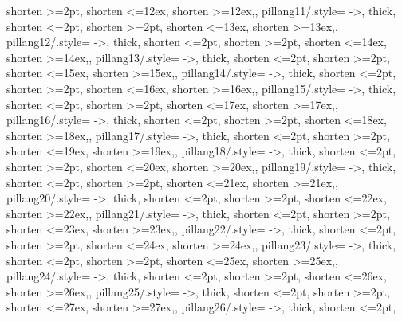 \documentclass[a4paper]{article}
\begin{document}
{{           shorten >=2pt,
           shorten <=12ex,
           shorten >=12ex,},
    pillang11/.style={
           ->,
           thick,
           shorten <=2pt,
           shorten >=2pt,
           shorten <=13ex,
           shorten >=13ex,},
    pillang12/.style={
           ->,
           thick,
           shorten <=2pt,
           shorten >=2pt,
           shorten <=14ex,
           shorten >=14ex,},
    pillang13/.style={
           ->,
           thick,
           shorten <=2pt,
           shorten >=2pt,
           shorten <=15ex,
           shorten >=15ex,},
    pillang14/.style={
           ->,
           thick,
           shorten <=2pt,
           shorten >=2pt,
           shorten <=16ex,
           shorten >=16ex,},
    pillang15/.style={
           ->,
           thick,
           shorten <=2pt,
           shorten >=2pt,
           shorten <=17ex,
           shorten >=17ex,},
    pillang16/.style={
           ->,
           thick,
           shorten <=2pt,
           shorten >=2pt,
           shorten <=18ex,
           shorten >=18ex,},
    pillang17/.style={
           ->,
           thick,
           shorten <=2pt,
           shorten >=2pt,
           shorten <=19ex,
           shorten >=19ex,},
    pillang18/.style={
           ->,
           thick,
           shorten <=2pt,
           shorten >=2pt,
           shorten <=20ex,
           shorten >=20ex,},
    pillang19/.style={
           ->,
           thick,
           shorten <=2pt,
           shorten >=2pt,
           shorten <=21ex,
           shorten >=21ex,},
    pillang20/.style={
           ->,
           thick,
           shorten <=2pt,
           shorten >=2pt,
           shorten <=22ex,
           shorten >=22ex,},
    pillang21/.style={
           ->,
           thick,
           shorten <=2pt,
           shorten >=2pt,
           shorten <=23ex,
           shorten >=23ex,},
    pillang22/.style={
           ->,
           thick,
           shorten <=2pt,
           shorten >=2pt,
           shorten <=24ex,
           shorten >=24ex,},
    pillang23/.style={
           ->,
           thick,
           shorten <=2pt,
           shorten >=2pt,
           shorten <=25ex,
           shorten >=25ex,},
    pillang24/.style={
           ->,
           thick,
           shorten <=2pt,
           shorten >=2pt,
           shorten <=26ex,
           shorten >=26ex,},
    pillang25/.style={
           ->,
           thick,
           shorten <=2pt,
           shorten >=2pt,
           shorten <=27ex,
           shorten >=27ex,},
    pillang26/.style={
           ->,
           thick,
           shorten <=2pt,
}}
\end{document}
